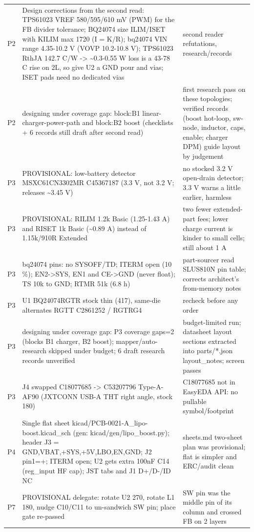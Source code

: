 \documentclass[11pt]{article}
\begin{document}
{\begin{longtable}{lp{5.2cm}p{7.2cm}}
P2 & Design corrections from the second read: TPS61023 VREF 580/595/610 mV (PWM) for the FB divider tolerance; BQ24074 size ILIM/ISET with KILIM max 1720 (I = K/R); bq24074 VIN range 4.35-10.2 V (VOVP 10.2-10.8 V); TPS61023 RthJA 142.7 C/W -\textgreater{} \textasciitilde{}0.3-0.55 W loss is a 43-78 C rise on 2L, so give U2 a GND pour and vias; ISET pads need no dedicated vias & second reader refutations, research/records \\
P2 & designing under coverage gap: block:B1 linear-charger-power-path and block:B2 boost (checklists + 6 records still draft after second read) & first research pass on these topologies; verified records (boost hot-loop, sw-node, inductor, caps, enable; charger DPM) guide layout by judgement \\
P3 & PROVISIONAL: low-battery detector MSXC61CN3302MR C45367187 (3.3 V, not 3.2 V; releases \textasciitilde{}3.45 V) & no stocked 3.2 V open-drain detector; 3.3 V warns a little earlier, harmless \\
P3 & PROVISIONAL: RILIM 1.2k Basic (1.25-1.43 A) and RISET 1k Basic (\textasciitilde{}0.89 A) instead of 1.15k/910R Extended & two fewer extended-part fees; lower charge current is kinder to small cells; still about 1 A \\
P3 & bq24074 pins: no SYSOFF/TD; ITERM open (10 \%); EN2-\textgreater{}SYS, EN1 and CE-\textgreater{}GND (never float); TS 10k to GND; RTMR 51k (6.8 h) & part-sourcer read SLUS810N pin table; corrects architect's from-memory notes \\
P3 & U1 BQ24074RGTR stock thin (417), same-die alternates RGTT C2861252 / RGTRG4 & recheck before any order \\
P3 & designing under coverage gap: P3 coverage gaps=2 (blocks B1 charger, B2 boost); mapper/auto-research skipped under budget; 6 draft research records unverified & budget-limited run; datasheet layout sections extracted into parts/{*}.json layout\_notes; screen passes \\
P3 & J4 swapped C18077685 -\textgreater{} C53207796 Type-A-AF90 (JXTCONN USB-A THT right angle, stock 180) & C18077685 not in EasyEDA API: no pullable symbol/footprint \\
P4 & Single flat sheet kicad/PCB-0021-A\_lipo-boost.kicad\_sch (gen: kicad/gen/lipo\_boost.py); header J3 = GND,VBAT,+SYS,+5V,LBO,EN,GND; J2 pin1=+; ITERM open; U2 gets extra 100nF C14 (reg\_input HF cap); JST tabs and J1 D+/D-/ID NC & sheets.md two-sheet plan was provisional; flat is simpler and ERC/audit clean \\
P7 & PROVISIONAL delegate: rotate U2 270, rotate L1 180, nudge C10/C11 to un-sandwich SW pin; place gate re-passed & SW pin was the middle pin of its column and crossed FB on 2 layers \\
\hline
\end{longtable}
}
\end{document}
